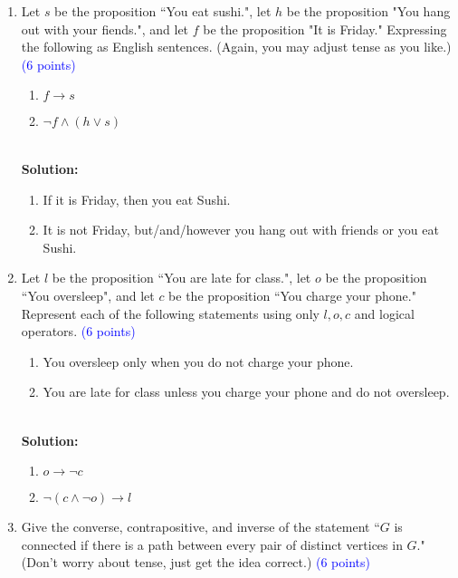\documentclass{article}
\newcommand{\pt}[1]{\textcolor{blue}{(#1 points)}}
\newenvironment{solution} {
    \par
    \color{blue}
    \vspace{2mm}
    \hline \\
    \textbf{Solution:}
} {
    \vspace{2mm}
    \newpage
}
\begin{document}
\begin{enumerate}
    \item Let $s$ be the proposition ``You eat sushi.", let $h$ be the proposition "You hang out with your fiends.", and let $f$ be the proposition "It is Friday." Expressing the following as English sentences. (Again, you may adjust tense as you like.) \pt 6
    \begin{enumerate}
        \item $f \rightarrow s$
        \item $\lnot f \wedge (h \lor s)$
    \end{enumerate}
    
    \begin{solution}
    \begin{enumerate}
        \item If it is Friday, then you eat Sushi.
        \item It is not Friday, but/and/however you hang out with friends or you eat Sushi.
    \end{enumerate}
    \end{solution}
    
    \item Let $l$ be the proposition ``You are late for class.", let $o$ be the proposition ``You oversleep", and let $c$ be the proposition ``You charge your phone." Represent each of the following statements using only $l, o, c$ and logical operators. \pt 6
    \begin{enumerate}
        \item You oversleep only when you do not charge your phone.
        \item You are late for class unless you charge your phone and do not oversleep.
    \end{enumerate}
    
    \begin{solution}
    \begin{enumerate}
        \item $o \rightarrow \neg c$
        \item $\neg (c \land \neg o) \rightarrow l$
    \end{enumerate}
    \end{solution}
    
    \item Give the converse, contrapositive, and inverse of the statement ``$G$ is connected if there is a path between every pair of distinct vertices in $G$." (Don't worry about tense, just get the idea correct.) \pt 6
    

\end{enumerate}
\end{document}
